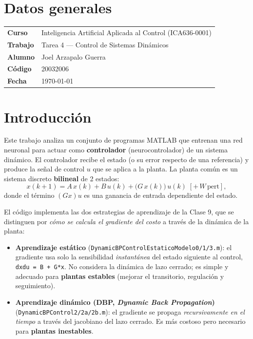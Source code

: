 \documentclass[11pt,a4paper]{article}
\newcommand{\code}[1]{\texttt{\small #1}}
\begin{document}
\section{Datos generales}
\begin{center}
\renewcommand{\arraystretch}{1.3}
\begin{tabular}{ll}
\toprule
\textbf{Curso} & Inteligencia Artificial Aplicada al Control (ICA636-0001) \\
\textbf{Trabajo} & Tarea 4 --- Control de Sistemas Dinámicos \\
\textbf{Alumno} & Joel Arzapalo Guerra \\
\textbf{Código} & 20032006 \\
\textbf{Fecha} & \today \\
\bottomrule
\end{tabular}
\end{center}
\vspace{0.5cm}

\section{Introducción}
Este trabajo analiza un conjunto de programas MATLAB que entrenan una red neuronal
para actuar como \textbf{controlador} (neurocontrolador) de un sistema dinámico. El
controlador recibe el estado (o su error respecto de una referencia) y produce la señal
de control $u$ que se aplica a la planta. La planta común es un sistema discreto
\textbf{bilineal} de 2 estados:
\[
  x(k{+}1) = A\,x(k) + B\,u(k) + \big(G\,x(k)\big)\,u(k) \;[+\,W\,\text{pert}],
\]
donde el término $(Gx)u$ es una ganancia de entrada dependiente del estado.

El código implementa las dos estrategias de aprendizaje de la Clase 9, que se distinguen
por \emph{cómo se calcula el gradiente del costo} a través de la dinámica de la planta:

\begin{itemize}
  \item \textbf{Aprendizaje estático} (\code{DynamicBPControlEstaticoModelo0/1/3.m}):
        el gradiente usa solo la sensibilidad \emph{instantánea} del estado siguiente al
        control, \code{dxdu = B + G*x}. No considera la dinámica de lazo cerrado; es
        simple y adecuado para \textbf{plantas estables} (mejorar el transitorio,
        regulación y seguimiento).
  \item \textbf{Aprendizaje dinámico (DBP, \emph{Dynamic Back Propagation})}
        (\code{DynamicBPControl2/2a/2b.m}): el gradiente se propaga
        \emph{recursivamente en el tiempo} a través del jacobiano del lazo cerrado. Es más
        costoso pero necesario para \textbf{plantas inestables}.
\end{itemize}
\end{document}
